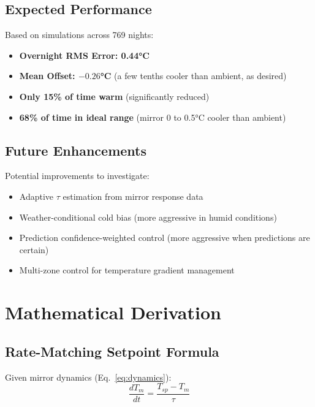 \documentclass[11pt,letterpaper]{article}
\begin{document}
\subsection{Expected Performance}

Based on simulations across 769 nights:
\begin{itemize}
    \item \textbf{Overnight RMS Error: 0.44°C}
    \item \textbf{Mean Offset: $-0.26$°C} (a few tenths cooler than ambient, as desired)
    \item \textbf{Only 15\% of time warm} (significantly reduced)
    \item \textbf{68\% of time in ideal range} (mirror 0 to 0.5°C cooler than ambient)
\end{itemize}

\subsection{Future Enhancements}

Potential improvements to investigate:
\begin{itemize}
    \item Adaptive $\tau$ estimation from mirror response data
    \item Weather-conditional cold bias (more aggressive in humid conditions)
    \item Prediction confidence-weighted control (more aggressive when predictions are certain)
    \item Multi-zone control for temperature gradient management
\end{itemize}

\appendix
\section{Mathematical Derivation}

\subsection{Rate-Matching Setpoint Formula}

Given mirror dynamics (Eq.~\ref{eq:dynamics}):
\begin{equation}
    \frac{dT_m}{dt} = \frac{T_{sp} - T_m}{\tau}
\end{equation}
\end{document}
